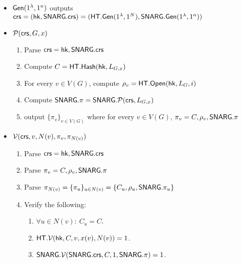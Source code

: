 \begin{itemize}
    \item $\mathsf{Gen}(1^\lambda, 1^n)$ outputs $\mathsf{crs} = (\mathsf{hk}, \mathsf{SNARG}.\mathsf{crs}) = (\mathsf{HT}.\mathsf{Gen}(1^\lambda, 1^N), \mathsf{SNARG}.\mathsf{Gen}(1^\lambda, 1^n))$
    \item $\mathcal{P}(\mathsf{crs}, G, x)$
    \begin{enumerate}
        \item Parse $\mathsf{crs} = \mathsf{hk}, \mathsf{SNARG}.\mathsf{crs}$
        \item Compute $C = \mathsf{HT}.\mathsf{Hash}(\mathsf{hk}, L_{G,x})$
        \item For every $v\in V(G)$, compute $\rho_v = \mathsf{HT}.\mathsf{Open}(\mathsf{hk}, L_G, i)$
        \item Compute $\mathsf{SNARG}.\pi = \mathsf{SNARG}.\mathcal{P}(\mathsf{crs},L_{G,x})$
        \item output $\{\pi_v\}_{v\in V(G)}$ where for every $v\in V(G)$, $\pi_v = C, \rho_v, \mathsf{SNARG}.\pi$
    \end{enumerate}
    \item $\mathcal{V}(\mathit{ \mathsf{crs} }, v, N(v), \pi_v, \pi_{N(v)} )$
    \begin{enumerate}
        \item Parse $\mathsf{crs} = \mathsf{hk}, \mathsf{SNARG}.\mathsf{crs}$
        \item Parse $\pi_v = C, \rho_v, \mathsf{SNARG}.\pi$
        \item Parse $\pi_{N(v)} = \{\pi_u\}_{u\in N(v)} = \{C_u, \rho_u, \mathsf{SNARG}.\pi_u\}$
        \item Verify the following:
        \begin{enumerate}
            \item $\forall u\in N(v): ~C_u = C$. \label{consistency}
            \item $\mathsf{HT}.\mathcal{V}(\mathsf{hk}, C, v, x(v), N(v)) = 1$. \label{openings}
            \item $\mathsf{SNARG}.\mathcal{V}(\mathsf{SNARG}.\mathsf{crs}, C, 1, \mathsf{SNARG}.\pi) = 1$.\label{snargproofver}
        \end{enumerate} 
    \end{enumerate}
\end{itemize}

